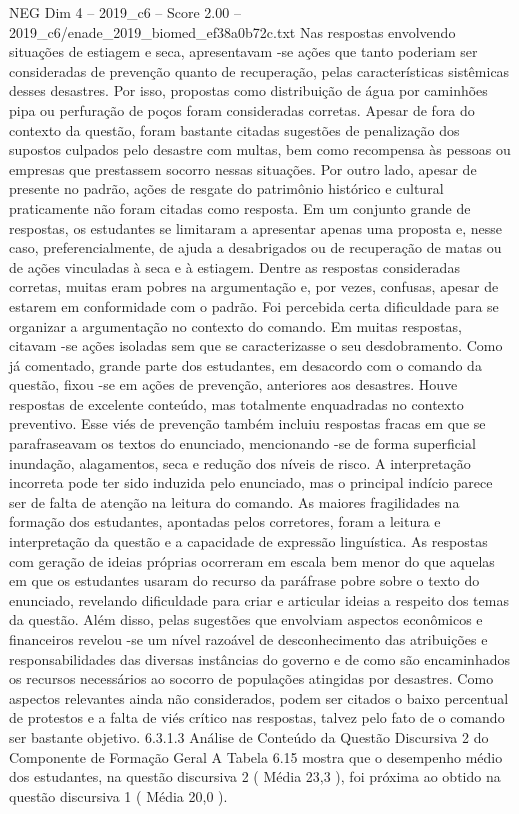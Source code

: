 \begin{textsample}{NEG Dim 4 – 2019\_c6 – Score 2.00 – 2019\_c6/enade\_2019\_biomed\_ef38a0b72c.txt}
Nas respostas envolvendo situações de estiagem e seca, apresentavam -se ações que tanto poderiam ser consideradas de prevenção quanto de recuperação, pelas características sistêmicas desses desastres.
Por isso, propostas como distribuição de água por caminhões pipa ou perfuração de poços foram consideradas corretas.
Apesar de fora do contexto da questão, foram bastante citadas sugestões de penalização dos supostos culpados pelo desastre com multas, bem como recompensa às pessoas ou empresas que prestassem socorro nessas situações.
Por outro lado, apesar de presente no padrão, ações de resgate do patrimônio histórico e cultural praticamente não foram citadas como resposta.
Em um conjunto grande de respostas, os estudantes se limitaram a apresentar apenas uma proposta e, nesse caso, preferencialmente, de ajuda a desabrigados ou de recuperação de matas ou de ações vinculadas à seca e à estiagem.
Dentre as respostas consideradas corretas, muitas eram pobres na argumentação e, por vezes, confusas, apesar de estarem em conformidade com o padrão.
Foi percebida certa dificuldade para se organizar a argumentação no contexto do comando.
Em muitas respostas, citavam -se ações isoladas sem que se caracterizasse o seu desdobramento.
Como já comentado, grande parte dos estudantes, em desacordo com o comando da questão, fixou -se em ações de prevenção, anteriores aos desastres.
Houve respostas de excelente conteúdo, mas totalmente enquadradas no contexto preventivo.
Esse viés de prevenção também incluiu respostas fracas em que se parafraseavam os textos do enunciado, mencionando -se de forma superficial inundação, alagamentos, seca e redução dos níveis de risco.
A interpretação incorreta pode ter sido induzida pelo enunciado, mas o principal indício parece ser de falta de atenção na leitura do comando.
As maiores fragilidades na formação dos estudantes, apontadas pelos corretores, foram a leitura e interpretação da questão e a capacidade de expressão linguística.
As respostas com geração de ideias próprias ocorreram em escala bem menor do que aquelas em que os estudantes usaram do recurso da paráfrase pobre sobre o texto do enunciado, revelando dificuldade para criar e articular ideias a respeito dos temas da questão.
Além disso, pelas sugestões que envolviam aspectos econômicos e financeiros revelou -se um nível razoável de desconhecimento das atribuições e responsabilidades das diversas instâncias do governo e de como são encaminhados os recursos necessários ao socorro de populações atingidas por desastres.
Como aspectos relevantes ainda não considerados, podem ser citados o baixo percentual de protestos e a falta de viés crítico nas respostas, talvez pelo fato de o comando ser bastante objetivo. 6.3.1.3 Análise de Conteúdo da Questão Discursiva 2 do Componente de Formação Geral A Tabela 6.15 mostra que o desempenho médio dos estudantes, na questão discursiva 2 ( Média 23,3 ), foi próxima ao obtido na questão discursiva 1 ( Média 20,0 ).

\end{textsample}
